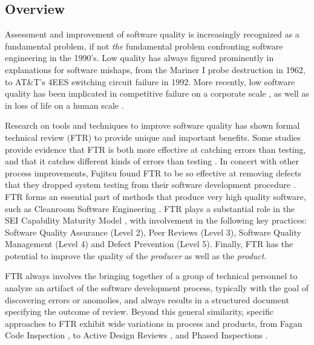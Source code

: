 
\subsection{Overview}

Assessment and improvement of software quality is increasingly recognized
as a fundamental problem, if not {\em the}\/ fundamental problem
confronting software engineering in the 1990's.  Low quality has always
figured prominently in explanations for software mishaps, from the Mariner
I probe destruction in 1962, to AT\&T's 4EES switching circuit failure in
1992.  More recently, low software quality has been implicated in
competitive failure on a corporate scale \cite{Arthur93}, as well as in
loss of life on a human scale \cite{Leveson93}.

Research on tools and techniques to improve software quality has shown
formal technical review (FTR) to provide unique and important benefits.
Some studies provide evidence that FTR is both more effective at catching
errors than testing, and that it catches different kinds of errors than
testing \cite{Myers78,Basili86}.  In concert with other process
improvements, Fujitsu found FTR to be so effective at removing defects that
they dropped system testing from their software development procedure
\cite{Arthur93}.  FTR forms an essential part of methods that produce very
high quality software, such as Cleanroom Software Engineering
\cite{Linger93}.  FTR plays a substantial role in the SEI Capability
Maturity Model \cite{Paulk93a}, with involvement in the following key
practices: Software Quality Assurance (Level 2), Peer Reviews (Level 3),
Software Quality Management (Level 4) and Defect Prevention (Level 5).
Finally, FTR has the potential to improve the quality of the {\em producer}\/
as well as the {\em product}.


FTR always involves the bringing together of a group of technical personnel
to analyze an artifact of the software development process, typically with
the goal of discovering errors or anomolies, and always results in a
structured document specifying the outcome of review.  Beyond this general
similarity, specific approaches to FTR exhibit wide variations in process
and products, from Fagan Code Inspection \cite{Fagan76,Fagan86}, to Active
Design Reviews \cite{Parnas85}, and Phased Inspections \cite{Knight91}.


